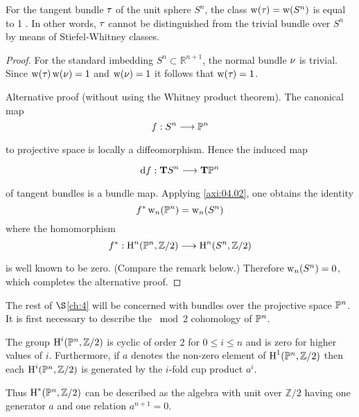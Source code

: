 \documentclass[../main]{subfiles}
\begin{document}
\begin{example}
\label{exa:04.01}
For the tangent bundle $\tau_{}$ of the unit sphere $S^{n}$, the class \newline $\operatorname{w}(\tau_{}) =\operatorname{w}(S^{n})$ is equal to 1 . In other words, $\tau_{}$ cannot be distinguished from the trivial bundle over $S^{n}$ by means of Stiefel-Whitney classes.
\end{example}
\begin{proof}
For the standard imbedding $S^{n} \subset \mathbb{R}^{n+1}$, the normal bundle $\nu_{}$ is trivial. Since $\operatorname{w}(\tau_{}) \operatorname{w}(\nu_{})=1$ and $\operatorname{w}(\nu_{})=1$ it follows that $\operatorname{w}(\tau_{})=1$.


Alternative proof (without using the Whitney product theorem). The \mbox{canonical} map
\[
f: S^{n} \varrightarrow{} \projective^{n}
\]
to projective space is locally a diffeomorphism. Hence the induced map

\[
\tangentbundlemap{f}: \tangentTS S^{n} \varrightarrow{} \tangentTS \projective^{n}
\]
of tangent bundles is a bundle map. Applying \ref{axi:04.02}, one obtains the identity
\[
f^{*} \operatorname{w}_{n}(\mathbb{P}^{n})=\operatorname{w}_{n}(S^{n})
\]
where the homomorphism
\[
f^{*}: \homology^{n}(\projective^{n}, \mathbb{Z} / 2) \varrightarrow{} \homology^{n}(S^{n}, \mathbb{Z} / 2)
\]
is well known to be zero. (Compare the remark below.) Therefore $\operatorname{w}_{n}(S^{n})=0$, which completes the alternative proof.

\end{proof}

The rest of $\S $\ref{ch:4} will be concerned with bundles over the projective space $\mathbb{P}^{n}$. It is first necessary to describe the $\bmod 2$ cohomology of $\mathbb{P}^{n}$.

\begin{lemma}
\label{lem:04.03}
The group $\operatorname{H}^i(\mathbb{P}^n, \mathbb{Z} / 2)$ is cyclic of order 2 for $0 \leq i \leq n$ and is zero for higher values of $i$. Furthermore, if $a$ denotes the non-zero element of $\operatorname{H}^1(\mathbb{P}^{n}, \mathbb{Z} / 2)$ then each $\operatorname{H}^i(\mathbb{P}^{n}, \mathbb{Z} / 2)$ is generated by the $i$-fold cup product $a^i$.
\end{lemma}

Thus $\operatorname{H}^*(\mathbb{P}^{n}, \mathbb{Z} / 2)$ can be described as the algebra with unit over $\mathbb{Z} / 2$ having one generator $a$ and one relation $a^{n+1}=0$.
\end{document}

